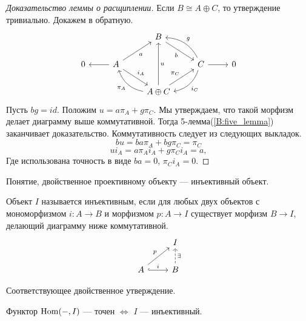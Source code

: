 \documentclass[../main.tex]{subfiles}
\begin{document}
\begin{proof}[Доказательство леммы о расщиплении]
  Если $B\cong A\oplus C$, то утверждение тривиально. Докажем в обратную.
  \begin{equation*}
    \begin{tikzcd}
	&& B \\
	0 & A && C & 0 \\
	&& {A\oplus C}
	\arrow["{i_A}", from=2-2, to=3-3]
	\arrow["{i_C}", from=2-4, to=3-3, bend left]
	\arrow["{\pi_A}", from=3-3, to=2-2, bend left]
	\arrow["{\pi_C}", from=3-3, to=2-4]
	\arrow["a"', from=2-2, to=1-3]
	\arrow["b"', from=1-3, to=2-4]
	\arrow["g"', from=2-4, to=1-3, bend right]
	\arrow[from=2-4, to=2-5]
	\arrow[from=2-2, to=2-1]
	\arrow["u"', from=3-3, to=1-3]
\end{tikzcd}
  \end{equation*}
  Пусть $bg=id$. Положим $u=a\pi_A + g\pi_C$. Мы утверждаем, что такой морфизм делает диаграмму выше коммутативной. Тогда 5-лемма(\ref{B:five_lemma}) заканчивает доказательство. Коммутативность следует из следующих выкладок.
  \begin{equation*}
    bu = ba\pi_A + bg\pi_C = \pi_C
  \end{equation*}
  \begin{equation*}
    ui_A = a\pi_Ai_A + g\pi_Ci_A = a,
  \end{equation*}
  Где использована точность в виде $ba = 0$, $\pi_Ci_A=0$.

\end{proof}
Понятие, двойственное проективному объекту --- инъективный объект.
\begin{to_def}\label{injective_def}
Объект $I$ называется инъективным, если для любых двух объектов с мономорфизмом $i:A\to B$ и морфизмом $p:A\to I$ существует морфизм $B\to I$, делающий диаграмму ниже коммутативной.
\begin{equation}\label{injective_def_diagram}
\begin{tikzcd}
	& I \\
	A & B
	\arrow["i", hook, from=2-1, to=2-2]
	\arrow["p", from=2-1, to=1-2]
	\arrow["\exists"', dashed, from=2-2, to=1-2]
\end{tikzcd}
\end{equation}
\end{to_def}
Соответствующее двойственное утверждение.
\begin{to_suj}
Функтор $\operatorname{Hom}(-, I)$ --- точен $\iff$ $I$ --- инъективный.
\end{to_suj}
\end{document}
